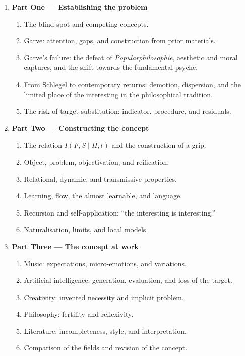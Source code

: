 \documentclass[11pt,a4paper]{article}
\begin{document}
\begin{enumerate}
  \item \textbf{Part One --- Establishing the problem}
    \begin{enumerate}
      \item The blind spot and competing concepts.
      \item Garve: attention, gaps, and construction from prior materials.
      \item Garve's failure: the defeat of \emph{Popularphilosophie}, aesthetic
            and moral captures, and the shift towards the fundamental psyche.
      \item From Schlegel to contemporary returns: demotion, dispersion, and
            the limited place of the interesting in the philosophical tradition.
      \item The risk of target substitution: indicator, procedure, and residuals.
    \end{enumerate}
  \item \textbf{Part Two --- Constructing the concept}
    \begin{enumerate}
      \item The relation \(I(F,S\mid H,t)\) and the construction of a grip.
      \item Object, problem, objectivation, and reification.
      \item Relational, dynamic, and transmissive properties.
      \item Learning, flow, the almost learnable, and language.
      \item Recursion and self-application: ``the interesting is interesting.''
      \item Naturalisation, limits, and local models.
    \end{enumerate}
  \item \textbf{Part Three --- The concept at work}
    \begin{enumerate}
      \item Music: expectations, micro-emotions, and variations.
      \item Artificial intelligence: generation, evaluation, and loss of the
            target.
      \item Creativity: invented necessity and implicit problem.
      \item Philosophy: fertility and reflexivity.
      \item Literature: incompleteness, style, and interpretation.
      \item Comparison of the fields and revision of the concept.
    \end{enumerate}
\end{enumerate}
\end{document}

